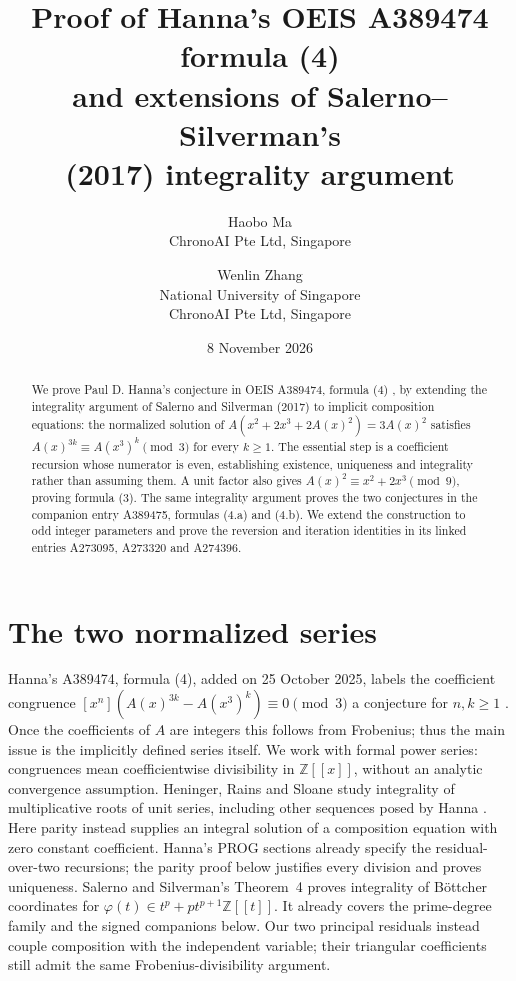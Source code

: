 \documentclass[11pt]{article}
\title{Proof of Hanna's OEIS A389474 formula (4)\protect\\
and extensions of Salerno--Silverman's\protect\\
(2017) integrality argument}
\author{Haobo Ma\\\small ChronoAI Pte Ltd, Singapore
\and Wenlin Zhang\\\small National University of Singapore\\\small ChronoAI Pte Ltd, Singapore}
\date{8 November 2026}
\newcommand{\Z}{\mathbb Z}
\newcommand{\coef}[1]{[x^{#1}]}
\begin{document}
\maketitle
\begin{abstract}
We prove Paul D. Hanna's conjecture in OEIS A389474, formula (4)
\cite{hanna474}, by extending the integrality argument of Salerno and
Silverman (2017) \cite{ss} to implicit composition equations:
the normalized solution of
$A(x^2+2x^3+2A(x)^2)=3A(x)^2$ satisfies
$A(x)^{3k}\equiv A(x^3)^k\pmod 3$ for every $k\geq1$.
The essential step is a coefficient recursion whose numerator is even,
establishing existence, uniqueness and integrality rather than assuming them.
A unit factor also gives $A(x)^2\equiv x^2+2x^3\pmod9$, proving formula (3).
The same integrality argument proves the two conjectures in the companion
entry A389475, formulas (4.a) and (4.b). We extend the construction to
odd integer parameters and prove the reversion and iteration identities
in its linked entries A273095, A273320 and A274396.
\end{abstract}

\section{The two normalized series}
Hanna's A389474, formula (4), added on 25 October 2025, labels the coefficient congruence
$\coef n(A(x)^{3k}-A(x^3)^k)\equiv0\pmod3$ a conjecture for $n,k\geq1$
\cite{hanna474}. Once the coefficients of $A$ are integers this follows
from Frobenius; thus the main issue is the implicitly defined series itself.
We work with formal power series: congruences mean coefficientwise
divisibility in $\Z[[x]]$, without an analytic convergence assumption.
Heninger, Rains and Sloane study integrality of multiplicative roots of
unit series, including other sequences posed by Hanna
\cite[Section 6]{hrs}. Here parity instead supplies an integral solution
of a composition equation with zero constant coefficient.
Hanna's PROG sections already specify the residual-over-two recursions;
the parity proof below justifies every division and proves uniqueness.
Salerno and Silverman's Theorem~4 \cite{ss} proves integrality of
B\"ottcher coordinates for $\varphi(t)\in t^p+pt^{p+1}\Z[[t]]$.
It already covers the prime-degree family and the signed companions
below. Our two principal residuals instead couple composition with the
independent variable; their triangular coefficients still admit the
same Frobenius-divisibility argument.
\end{document}
